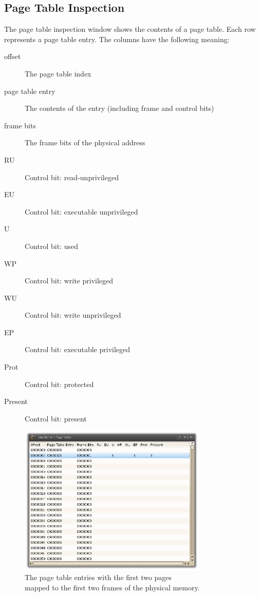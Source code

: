 \subsection{Page Table Inspection}
The page table inspection window shows the contents of a page table. Each row represents a page table entry. The columns have the following meaning:
\begin{description}
\item[offset] The page table index
\item[page table entry] The contents of the entry (including frame and control bits)
\item[frame bits] The frame bits of the physical address
\item[RU] Control bit: read-unprivileged
\item[EU] Control bit: executable unprivileged
\item[U] Control bit: used
\item[WP] Control bit: write privileged
\item[WU] Control bit: write unprivileged
\item[EP] Control bit: executable privileged
\item[Prot] Control bit: protected
\item[Present] Control bit: present
\end{description}


\begin{figure}[H]
\begin{center}
	\includegraphics[width=0.8\textwidth]{./files/emu_gui_mmu_pagetable.png}
\end{center}
	\captionsetup{justification=centering}
	\caption{The page table entries with the first two pages \\mapped to the first two frames of the physical memory.}
\end{figure}
